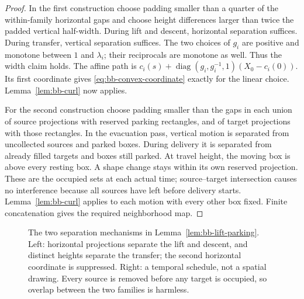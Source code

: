 \begin{proof}
In the first construction choose padding smaller than a quarter of
the within-family horizontal gaps and choose height differences larger
than twice the padded vertical half-width.  During lift and descent,
horizontal separation suffices.  During transfer, vertical separation
suffices.  The two choices of $g_i$ are positive and monotone between
$1$ and $\lambda_i$; their reciprocals are monotone as well.  Thus the
width claim holds.  The affine path is
$c_i(s)+\operatorname{diag}(g_i,g_i^{-1},1)(X_0-c_i(0))$.
Its first coordinate gives \eqref{eq:bb-convex-coordinate} exactly for
the linear choice.  Lemma~\ref{lem:bb-curl} now applies.

For the second construction choose padding smaller than the gaps in
each union of source projections with reserved parking rectangles, and
of target projections with those rectangles.  In the evacuation pass,
vertical motion is separated from uncollected sources and parked boxes.
During delivery it is separated from already filled targets and boxes
still parked.  At travel height, the moving box is above every resting
box.  A shape change stays within its own reserved projection.
These are the occupied sets at each actual time; source--target
intersection causes no interference because all sources have left
before delivery starts.  Lemma~\ref{lem:bb-curl} applies to each motion
with every other box fixed.  Finite concatenation gives the required
neighborhood map.
\end{proof}

\begin{figure}[ht]
\centering
{}
\caption{The two separation mechanisms in
Lemma~\ref{lem:bb-lift-parking}.  Left: horizontal projections separate
the lift and descent, and distinct heights separate the transfer;
the second horizontal coordinate is suppressed.  Right: a temporal
schedule, not a spatial drawing.  Every source is removed before any
target is occupied, so overlap between the two families is harmless.}
\label{fig:bb-routing}
\end{figure}

